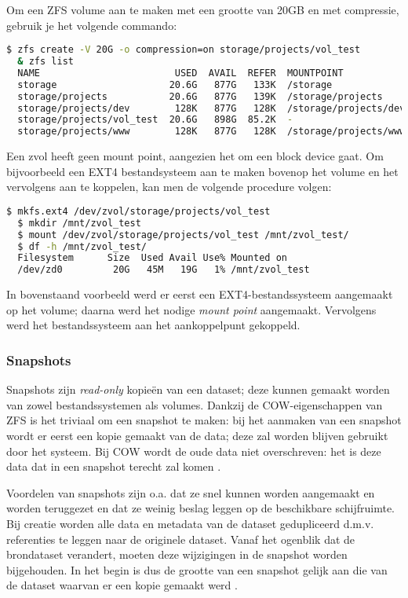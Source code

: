 \clearpage

Om een ZFS volume aan te maken met een grootte van 20GB en met compressie, gebruik je het volgende commando:

\begin{lstlisting}[language=bash,style=command_style] 
  $ zfs create -V 20G -o compression=on storage/projects/vol_test
  & zfs list
  NAME                        USED  AVAIL  REFER  MOUNTPOINT
  storage                    20.6G   877G   133K  /storage
  storage/projects           20.6G   877G   139K  /storage/projects
  storage/projects/dev        128K   877G   128K  /storage/projects/dev
  storage/projects/vol_test  20.6G   898G  85.2K  -
  storage/projects/www        128K   877G   128K  /storage/projects/www
\end{lstlisting}

Een zvol heeft geen mount point, aangezien het om een block device gaat. Om bijvoorbeeld een EXT4 bestandsysteem aan te maken bovenop het volume en het vervolgens aan te koppelen, kan men de volgende procedure volgen:

\begin{lstlisting}[language=bash,style=command_style] 
  $ mkfs.ext4 /dev/zvol/storage/projects/vol_test
  $ mkdir /mnt/zvol_test
  $ mount /dev/zvol/storage/projects/vol_test /mnt/zvol_test/
  $ df -h /mnt/zvol_test/
  Filesystem      Size  Used Avail Use% Mounted on
  /dev/zd0         20G   45M   19G   1% /mnt/zvol_test
\end{lstlisting}

In bovenstaand voorbeeld werd er eerst een EXT4-bestandssysteem aangemaakt op het volume; daarna werd het nodige \textit{mount point} aangemaakt. Vervolgens werd het bestandssysteem aan het aankoppelpunt gekoppeld.  

\subsubsection{Snapshots}

Snapshots zijn \textit{read-only} kopieën van een dataset; deze kunnen gemaakt worden van zowel bestandssystemen als volumes. Dankzij de COW-eigenschappen van ZFS is het triviaal om een snapshot te maken: bij het aanmaken van een snapshot wordt er eerst een kopie gemaakt van de data; deze zal worden blijven gebruikt door het systeem. Bij COW wordt de oude data niet overschreven: het is deze data dat in een snapshot terecht zal komen \autocite{Lucas2015}.

Voordelen van snapshots zijn o.a. dat ze snel kunnen worden aangemaakt en worden teruggezet en dat ze weinig beslag leggen op de beschikbare schijfruimte. Bij creatie worden alle data en metadata van de dataset gedupliceerd d.m.v. referenties te leggen naar de originele dataset. Vanaf het ogenblik dat de brondataset verandert, moeten deze wijzigingen in de snapshot worden bijgehouden. In het begin is dus de grootte van een snapshot gelijk aan die van de dataset waarvan er een kopie gemaakt werd \autocite{FBSDDP2017}.

